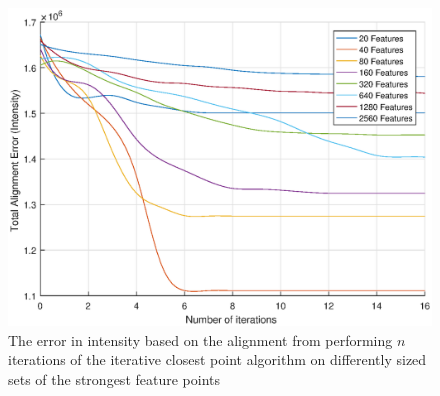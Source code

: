 \documentclass{article}
\begin{document}
\begin{figure}[h]
	\centering
	\includegraphics[width=\textwidth]{figures/alignment/error_for_alignment}
	\caption{The error in intensity based on the alignment from performing $n$ iterations of the iterative closest point algorithm on differently sized sets of the strongest feature points}
	\label{fig_results_alignment_error_plot}
\end{figure}

\pagebreak
\clearpage



\end{document}
